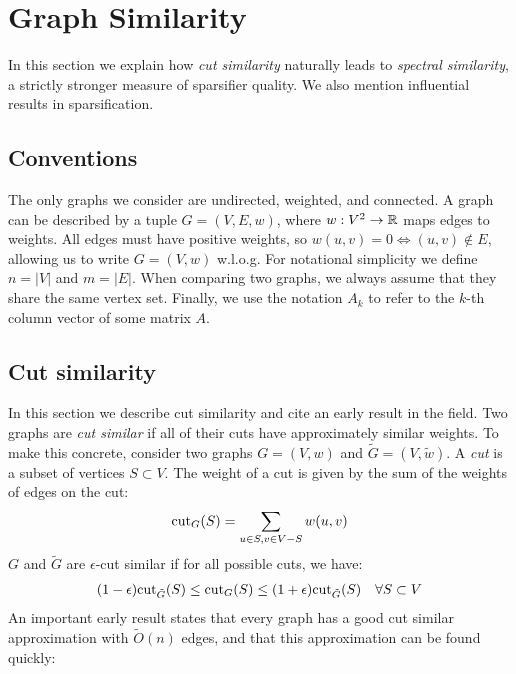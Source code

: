 \documentclass{article}
\begin{document}
\section{Graph Similarity}

In this section we explain how \textit{cut similarity} naturally leads to
\textit{spectral similarity}, a strictly stronger measure of sparsifier
quality. We also mention influential results in sparsification.

\subsection{Conventions}

The only graphs we consider are undirected, weighted, and connected. A graph
can be described by a tuple $G = (V, E, w)$, where $w : V^2 \rightarrow \mathbb{R}$
maps edges to weights. All edges must have positive weights, so $w(u, v) = 0
\Leftrightarrow (u, v) \not\in E$, allowing us to write $G = (V, w)$
w.l.o.g. For notational simplicity we define $n = |V|$ and $m = |E|$. When
comparing two graphs, we always assume that they share the same vertex set.
Finally, we use the notation $A_k$ to refer to the $k$-th column vector of
some matrix $A$. 

\subsection{Cut similarity}

In this section we describe cut similarity and cite an early result in the
field. Two graphs are \textit{cut similar} if all of their cuts have
approximately similar weights. To make this concrete, consider two graphs $G
= (V, w)$ and $\tilde{G} = (V, \tilde{w})$. A \textit{cut} is a subset of
vertices $S \subset V$.  The weight of a cut is given by the sum of the
weights of edges on the cut:
\begin{align*}
    \text{cut}_{G}(S) = \sum_{u \in S, v \in V - S} w(u, v)
\end{align*}
$G$ and $\tilde{G}$ are $\epsilon$-cut similar if for all possible cuts, we
have:
\begin{align*}
    (1 - \epsilon)\text{cut}_{\tilde{G}}(S) \leq \text{cut}_{G}(S) \leq (1 +
    \epsilon)\text{cut}_{\tilde{G}}(S) \quad \forall{S \subset V}
\end{align*}
An important early result states that every graph has a good cut similar
approximation with $\tilde{O}(n)$ edges, and that this approximation can be
found quickly: \\
\end{document}
